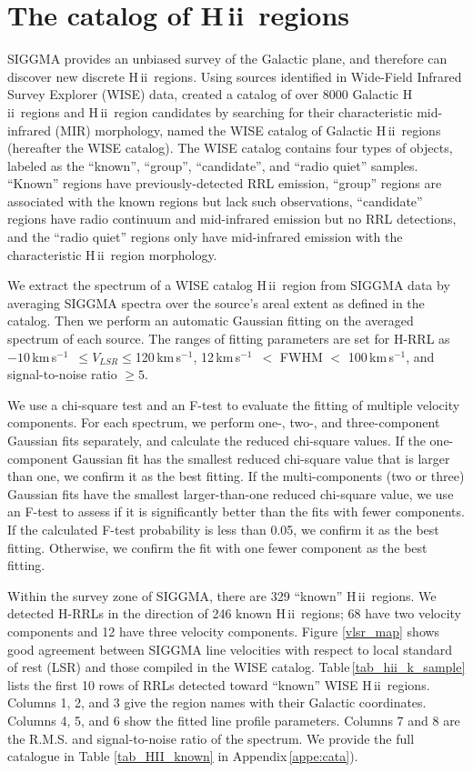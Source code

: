 \documentclass[manuscript]{aastex61}
\newcommand{\hii}{{\rm H\,}{{\sc ii}}}
\newcommand{\kms}{\,km\,s$^{-1}$}
\begin{document}
\section{The catalog of \hii\ regions} \label{sec_cata}

SIGGMA provides an unbiased survey of the Galactic plane, and therefore can discover new discrete \hii\ regions.
Using sources identified in Wide-Field Infrared Survey Explorer (WISE) data, \citet{Anderson2014} created a catalog of over 8000 Galactic \hii\ regions and \hii\ region candidates by searching for their characteristic mid-infrared (MIR) morphology, named the WISE catalog of Galactic \hii\ regions (hereafter the WISE catalog).
The WISE catalog contains four types of objects, labeled as the ``known'', ``group'', ``candidate'', and ``radio quiet'' samples.
``Known'' regions have previously-detected RRL emission, ``group'' regions are associated with the known regions but lack such observations, ``candidate'' regions have radio continuum and mid-infrared emission but no RRL detections, and the ``radio quiet'' regions only have mid-infrared emission with the characteristic \hii\ region morphology.

We extract the spectrum of a WISE catalog \hii\ region from SIGGMA data by averaging SIGGMA spectra over the source's areal extent as defined in the catalog.
Then we perform an automatic Gaussian fitting on the averaged spectrum of each source. 
The ranges of fitting parameters are set for H-RRL as $-10$\kms\ $\leq V_{LSR} \leq $120\kms, 12\kms\ $<$ FWHM $<$ 100\kms, and signal-to-noise ratio $\geq 5$.  

We use a chi-square test and an F-test to evaluate the fitting of multiple velocity components.
For each spectrum, we perform one-, two-, and three-component Gaussian fits separately, and calculate the reduced chi-square values.
If the one-component Gaussian fit has the smallest reduced chi-square value that is larger than one, we confirm it as the best fitting.
If the multi-components (two or three) Gaussian fits have the smallest larger-than-one reduced chi-square value, we use an F-test to assess if it is significantly better than the fits with fewer components.
If the calculated F-test probability is less than 0.05, we confirm it as the best fitting.
Otherwise, we confirm the fit with one fewer component as the best fitting.

Within the survey zone of SIGGMA, there are 329 ``known'' \hii\ regions.
We detected H-RRLs in the direction of 246 known \hii\ regions; 68 have two velocity components and 12 have three velocity components.
Figure \ref{vlsr_map} shows good agreement between SIGGMA line velocities with respect to local standard of rest (LSR) and those compiled in the WISE catalog.
Table\,\ref{tab_hii_k_sample} lists the first 10 rows of RRLs detected toward ``known'' WISE \hii\ regions.
Columns 1, 2, and 3 give the region names with their Galactic coordinates.
Columns 4, 5, and 6 show the fitted line profile parameters. 
Columns 7 and 8 are the R.M.S. and signal-to-noise ratio of the spectrum.
We provide the full catalogue in Table \ref{tab_HII_known} in Appendix\,\ref{appe:cata}).
\end{document}
